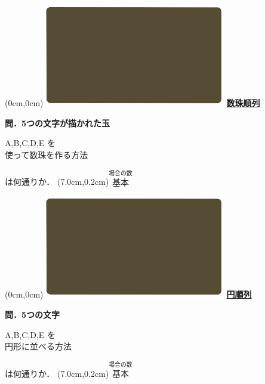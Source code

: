 \documentclass[10pt,
fleqn,
dvipdfmx,
uplatex
]{jsarticle}
\begin{document}
\newpage



\at(0cm,0cm){\includegraphics[width=8cm,bb=0 0 1920 1080]{./youtube/thumbnails/templates/smart_background/場合の数.jpeg}}
{\color{orange}\bf\boldmath\huge\underline{数珠順列}}\vspace{0.3zw}

\large
\bf\boldmath 問．5つの文字が描かれた玉

\huge
\vspace{-0.2zw}
A,\;B,\;C,\;D,\;E を\\
\hfill 使って数珠を作る方法
\vspace{0.1zw}

\large
\hfill
は何通りか．
\at(7.0cm,0.2cm){\small\color{bradorange}$\overset{\text{場合の数}}{\text{基本}}$}


\newpage



\at(0cm,0cm){\includegraphics[width=8cm,bb=0 0 1920 1080]{./youtube/thumbnails/templates/smart_background/場合の数.jpeg}}
{\color{orange}\bf\boldmath\huge\underline{円順列}}\vspace{0.3zw}


\large
\bf\boldmath 問．5つの文字

\Huge
\vspace{-0.2zw}
A,\;B,\;C,\;D,\;E を\vspace{-0.2zw}\\
\hfill 
円形に並べる方法
\vspace{0.1zw}

\large
\hfill
は何通りか．
\at(7.0cm,0.2cm){\small\color{bradorange}$\overset{\text{場合の数}}{\text{基本}}$}
\end{document}

